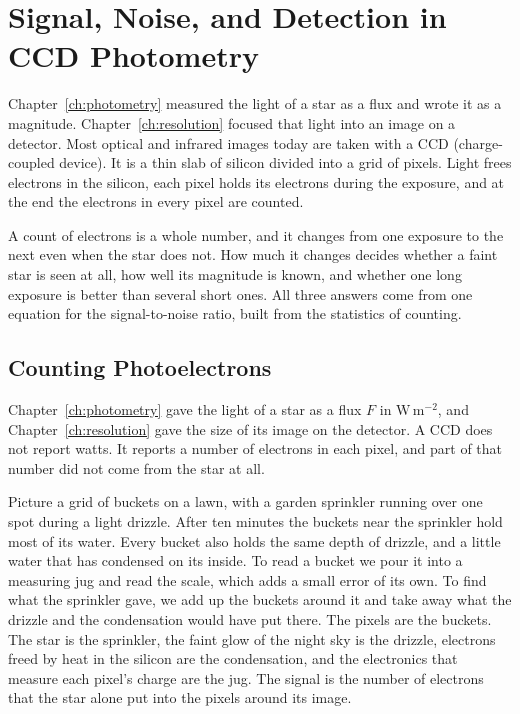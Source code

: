 \chapter{Signal, Noise, and Detection in CCD Photometry}
\label{ch:ccd}

Chapter~\ref{ch:photometry} measured the light of a star as a flux and wrote it as a magnitude. Chapter~\ref{ch:resolution} focused that light into an image on a detector. Most optical and infrared images today are taken with a CCD (charge-coupled device). It is a thin slab of silicon divided into a grid of pixels. Light frees electrons in the silicon, each pixel holds its electrons during the exposure, and at the end the electrons in every pixel are counted.

A count of electrons is a whole number, and it changes from one exposure to the next even when the star does not. How much it changes decides whether a faint star is seen at all, how well its magnitude is known, and whether one long exposure is better than several short ones. All three answers come from one equation for the signal-to-noise ratio, built from the statistics of counting.

\section{Counting Photoelectrons}
\label{cc:sec:counting}

Chapter~\ref{ch:photometry} gave the light of a star as a flux $F$ in $\mathrm{W\,m^{-2}}$, and Chapter~\ref{ch:resolution} gave the size of its image on the detector. A CCD does not report watts. It reports a number of electrons in each pixel, and part of that number did not come from the star at all.

Picture a grid of buckets on a lawn, with a garden sprinkler running over one spot during a light drizzle. After ten minutes the buckets near the sprinkler hold most of its water. Every bucket also holds the same depth of drizzle, and a little water that has condensed on its inside. To read a bucket we pour it into a measuring jug and read the scale, which adds a small error of its own. To find what the sprinkler gave, we add up the buckets around it and take away what the drizzle and the condensation would have put there. The pixels are the buckets. The star is the sprinkler, the faint glow of the night sky is the drizzle, electrons freed by heat in the silicon are the condensation, and the electronics that measure each pixel's charge are the jug. The signal is the number of electrons that the star alone put into the pixels around its image.

